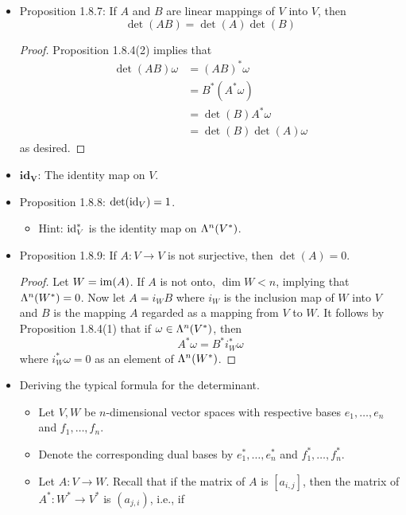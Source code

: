 \documentclass[../notes.tex]{subfiles}
\begin{document}
\begin{itemize}
    \item Proposition 1.8.7: If $A$ and $B$ are linear mappings of $V$ into $V$, then
    \begin{equation*}
        \det(AB) = \det(A)\det(B)
    \end{equation*}
    \begin{proof}
        Proposition 1.8.4(2) implies that
        \begin{align*}
            \det(AB)\omega &= (AB)^*\omega\\
            &= B^*(A^*\omega)\\
            &= \det(B)A^*\omega\\
            &= \det(B)\det(A)\omega
        \end{align*}
        as desired.
    \end{proof}
    \item $\textbf{id}_{\bm{V}}$: The identity map on $V$.
    \item Proposition 1.8.8: $\det(\id_V)=1$.
    \begin{itemize}
        \item Hint: $\id_V^*$ is the identity map on $\lam[n]{V^*}$.
    \end{itemize}
    \item Proposition 1.8.9: If $A:V\to V$ is not surjective, then $\det(A)=0$.
    \begin{proof}
        Let $W=\im(A)$. If $A$ is not onto, $\dim W<n$, implying that $\lam[n]{W^*}=0$. Now let $A=i_WB$ where $i_W$ is the inclusion map of $W$ into $V$ and $B$ is the mapping $A$ regarded as a mapping from $V$ to $W$. It follows by Proposition 1.8.4(1) that if $\omega\in\lam[n]{V^*}$, then
        \begin{equation*}
            A^*\omega = B^*i_W^*\omega
        \end{equation*}
        where $i_W^*\omega=0$ as an element of $\lam[n]{W^*}$.
    \end{proof}
    \item Deriving the typical formula for the determinant.
    \begin{itemize}
        \item Let $V,W$ be $n$-dimensional vector spaces with respective bases $e_1,\dots,e_n$ and $f_1,\dots,f_n$.
        \item Denote the corresponding dual bases by $e_1^*,\dots,e_n^*$ and $f_1^*,\dots,f_n^*$.
        \item Let $A:V\to W$. Recall that if the matrix of $A$ is $[a_{i,j}]$, then the matrix of $A^*:W^*\to V^*$ is $(a_{j,i})$, i.e., if

\end{itemize}
\end{itemize}
\end{document}
